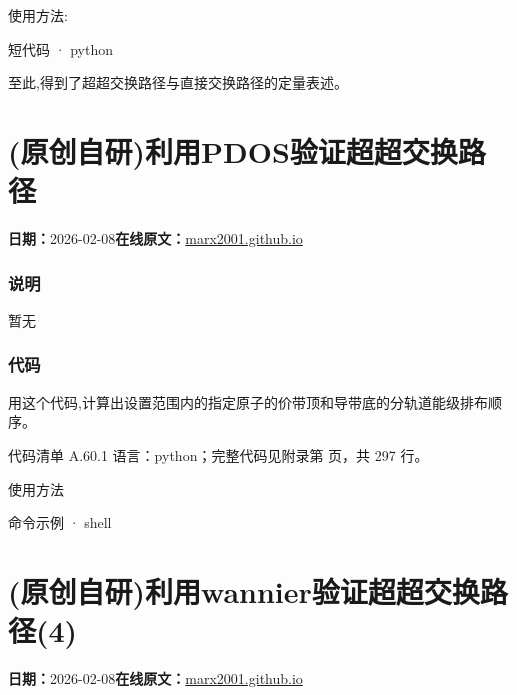 \documentclass[lang=cn,scheme=chinese,color=blue,device=normal,toc=onecol,math=cm]{elegantbook}
\begin{document}
使用方法:\par


\begin{inlinecodebox}{短代码 · python}
\end{inlinecodebox}


至此,得到了超超交换路径与直接交换路径的定量表述。\par



\section{(原创自研)利用PDOS验证超超交换路径}
\begin{articlemeta}
\textbf{日期：}2026-02-08\hfill\textbf{在线原文：}\href{https://marx2001.github.io/sci-note\_posts/20260208-pdos}{marx2001.github.io}
\end{articlemeta}

\subsubsection{说明}


暂无\par


\subsubsection{代码}


用这个代码,计算出设置范围内的指定原子的价带顶和导带底的分轨道能级排布顺序。\par


\begin{codeindexbox}{代码清单 A.60.1}
语言：python；完整代码见附录第 \pageref{code:60:1} 页，共 297 行。
\end{codeindexbox}


使用方法\par


\begin{inlinecodebox}{命令示例 · shell}
\end{inlinecodebox}



\section{(原创自研)利用wannier验证超超交换路径(4)}
\begin{articlemeta}
\textbf{日期：}2026-02-08\hfill\textbf{在线原文：}\href{https://marx2001.github.io/sci-note\_posts/20260208-super4}{marx2001.github.io}
\end{articlemeta}
\end{document}
